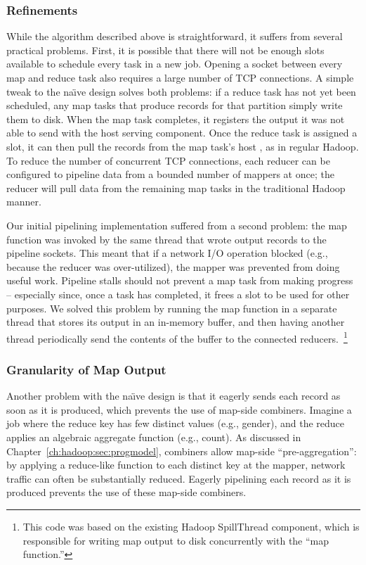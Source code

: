 \subsubsection{Refinements}
\label{ch:hop:sec:pipe-refine}

While the algorithm described above is straightforward, it suffers from several
practical problems.  First, it is possible that there will not be enough slots
available to schedule every task in a new job.  Opening a socket between every
map and reduce task also requires a large number of TCP connections.  A simple
tweak to the na\"{\i}ve design solves both problems: if a reduce task has not
yet been scheduled, any map tasks that produce records for that partition
simply write them to disk.  When the map task completes, it registers the output
it was not able to send with the host \TT serving component.  Once the reduce
task is assigned a slot, it can then pull the records from the map task's host
\TT, as in regular Hadoop.  To reduce the number of concurrent TCP connections,
each reducer can be configured to pipeline data from a bounded number of
mappers at once; the reducer will pull data from the remaining map tasks in the
traditional Hadoop manner.

Our initial pipelining implementation suffered from a second problem: the map
function was invoked by the same thread that wrote output records to the
pipeline sockets.  This meant that if a network I/O operation blocked (e.g.,
because the reducer was over-utilized), the mapper was prevented from doing
useful work.  Pipeline stalls should not prevent a map task from making
progress -- especially since, once a task has completed, it frees a {\TT} slot
to be used for other purposes.  We solved this problem by running the map
function in a separate thread that stores its output in an in-memory buffer,
and then having another thread periodically send the contents of the buffer to
the connected reducers.~\footnote{This code was based on the existing Hadoop
SpillThread component, which is responsible for writing map output to disk
concurrently with the ``map function.''}

\subsubsection{Granularity of Map Output}
\label{ch:hop:sec:mapout}

Another problem with the na\"{\i}ve design is that it eagerly sends each record
as soon as it is produced, which prevents the use of map-side combiners.
Imagine a job where the reduce key has few distinct values (e.g., gender), and
the reduce applies an algebraic aggregate function (e.g., count).  As discussed
in Chapter~\ref{ch:hadoop:sec:progmodel}, combiners allow map-side
``pre-aggregation'': by applying a reduce-like function to each distinct key at
the mapper, network traffic can often be substantially reduced.  Eagerly
pipelining each record as it is produced prevents the use of these map-side
combiners.

